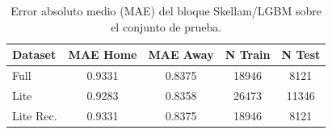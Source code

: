 \begin{table}[htbp]
    \centering
    \caption{Error absoluto medio (MAE) del bloque Skellam/LGBM sobre el conjunto de prueba.}
    \label{tab:skellam_mae}
    \begin{tabular}{lcccc}
        \toprule
        \textbf{Dataset} & \textbf{MAE Home} & \textbf{MAE Away} & \textbf{N Train} & \textbf{N Test} \\
        \midrule
        Full & 0.9331 & 0.8375 & 18946 & 8121 \\
        Lite & 0.9283 & 0.8358 & 26473 & 11346 \\
        Lite Rec. & 0.9331 & 0.8375 & 18946 & 8121 \\
        \bottomrule
    \end{tabular}
\end{table}